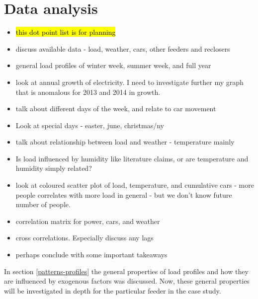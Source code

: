 \section{Data analysis}
\label{bruny-data-analysis}
\begin{itemize}
	\item \hl{this dot point list is for planning}
	\item discuss available data - load, weather, cars, other feeders and reclosers
	\item general load profiles of winter week, summer week, and full year
	\item look at annual growth of electricity. I need to investigate further my graph that is anomalous for 2013 and 2014 in growth.
	\item talk about different days of the week, and relate to car movement
	\item Look at special days - easter, june, christmas/ny
	\item talk about relationship between load and weather - temperature mainly
	\item Is load influenced by humidity like literature claims, or are temperature and humidity simply related?
	\item look at coloured scatter plot of load, temperature, and cumulative cars - more people correlates with more load in general - but we don't know future number of people.
	\item correlation matrix for power, cars, and weather
	\item cross correlations. Especially discuss any lags
	\item perhaps conclude with some important takeaways
	
\end{itemize}

In section \ref{patterns-profiles} the general properties of load profiles and how they are influenced by exogenous factors was discussed. Now, these general properties will be investigated in depth for the particular feeder in the case study.
